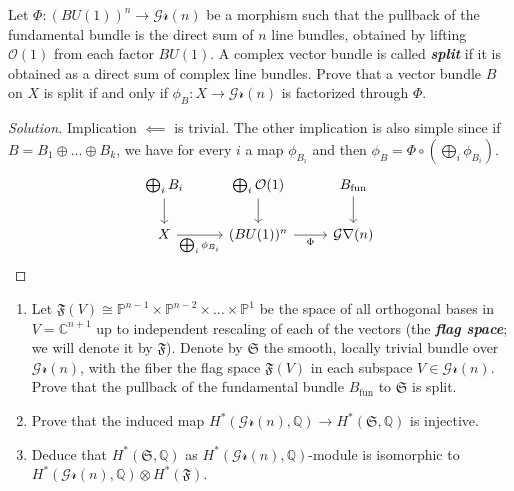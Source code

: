 \begin{manualexercise}{3.4}
	Let $ \Phi:(BU(1))^n\longrightarrow \mathcal{Gr}(n)$ be a morphism such that the pullback of the fundamental bundle is the direct sum of $n$ line bundles, obtained by lifting $\mathcal{O}(1)$ from each factor $BU(1)$. A complex vector bundle is called \textit{\textbf{split}} if it is obtained as a direct sum of complex line bundles. Prove that a vector bundle $B$ on $X$ is split if and only if $\phi_B:X\longrightarrow \mathcal{Gr}(n)$ is factorized through $\Phi$.
\end{manualexercise}

\begin{proof}[Solution]\leavevmode
	Implication $\impliedby$ is trivial. The other implication is also simple since if $B =B_1\oplus \ldots \oplus B_k$, we have for every $i$ a map $\phi_{B_i}$ and then $\phi_B=\Phi\circ \left(\bigoplus_{i} \phi_{B_i} \right)$.
	\[\begin{tikzcd}
		\bigoplus_{i} B_i\arrow[d]&\bigoplus_{i} \mathcal{O}(1)\arrow[d]& B_{\operatorname{fun}}\arrow[d]\\
		X\arrow[r,swap,"\bigoplus_{i} \phi_{B_i}" ]&(BU(1))^n\arrow[r,"\Phi",swap]&\mathcal{Gr}(n)
	\end{tikzcd}\]
\end{proof}

\begin{manualexercise}{3.5}\leavevmode 
	\begin{enumerate}[label=\alph*.]
		\item Let $\mathfrak{F}(V)\cong \mathbb{P}^{n-1}\times \mathbb{P}^{n-2}\times \ldots \times \mathbb{P}^1$ be the space of all orthogonal bases in $V=\mathbb{C}^{n+1}$ up to independent rescaling of each of the vectors (the \textit{\textbf{flag space}}; we will denote it by $\mathfrak{F}$). Denote by $\mathfrak{S}$ the smooth, locally trivial bundle over $\mathcal{Gr}(n)$, with the fiber the flag space $\mathfrak{F}(V)$ in each subspace $V\in\mathcal{Gr}(n)$. Prove that the pullback of the fundamental bundle $B_{\operatorname{fun}}$ to $\mathfrak{S}$ is split.

		\item Prove that the induced map $H^* (\mathcal{Gr}(n),\mathbb{Q})\to H^*(\mathfrak{S},\mathbb{Q})$ is injective.

		\item Deduce that $H^*(\mathfrak{S},\mathbb{Q})$ as  $H^{*}(\mathcal{Gr}(n),\mathbb{Q})$-module is isomorphic to $H^{*}(\mathcal{Gr}(n),\mathbb{Q})\otimes H^{*}(\mathfrak{F})$.
	\end{enumerate}
\end{manualexercise}

